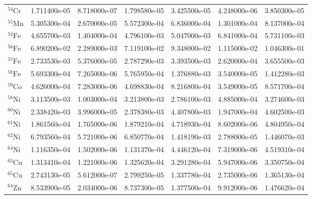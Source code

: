 \begin{tabular}{lrrrrrr}
$^{54}\mathrm{Cr}$  &       1.711400e-05 &      8.718000e-07 &      1.798580e-05 &       3.425500e-05 &      4.248000e-06 &      3.850300e-05 \\
$^{55}\mathrm{Mn}$  &       5.305300e-04 &      2.670000e-05 &      5.572300e-04 &       6.836000e-04 &      1.301000e-04 &      8.137000e-04 \\
$^{54}\mathrm{Fe}$  &       4.655700e-03 &      1.404000e-04 &      4.796100e-03 &       5.047000e-03 &      6.841000e-04 &      5.731100e-03 \\
$^{56}\mathrm{Fe}$  &       6.890200e-02 &      2.289000e-03 &      7.119100e-02 &       9.348000e-02 &      1.115000e-02 &      1.046300e-01 \\
$^{57}\mathrm{Fe}$  &       2.733530e-03 &      5.376000e-05 &      2.787290e-03 &       3.393500e-03 &      2.620000e-04 &      3.655500e-03 \\
$^{58}\mathrm{Fe}$  &       5.693300e-04 &      7.265000e-06 &      5.765950e-04 &       1.376880e-03 &      3.540000e-05 &      1.412280e-03 \\
$^{59}\mathrm{Co}$  &       4.626000e-04 &      7.283000e-06 &      4.698830e-04 &       8.216800e-04 &      3.549000e-05 &      8.571700e-04 \\
$^{58}\mathrm{Ni}$  &       3.113500e-03 &      1.003000e-04 &      3.213800e-03 &       2.786100e-03 &      4.885000e-04 &      3.274600e-03 \\
$^{60}\mathrm{Ni}$  &       2.338420e-03 &      3.996000e-05 &      2.378380e-03 &       4.407800e-03 &      1.947000e-04 &      4.602500e-03 \\
$^{61}\mathrm{Ni}$  &       1.861560e-04 &      1.765000e-06 &      1.879210e-04 &       4.718930e-04 &      8.602000e-06 &      4.804950e-04 \\
$^{62}\mathrm{Ni}$  &       6.793560e-04 &      5.721000e-06 &      6.850770e-04 &       1.418190e-03 &      2.788000e-05 &      1.446070e-03 \\
$^{64}\mathrm{Ni}$  &       1.116350e-04 &      1.502000e-06 &      1.131370e-04 &       4.446120e-04 &      7.319000e-06 &      4.519310e-04 \\
$^{63}\mathrm{Cu}$  &       1.313410e-04 &      1.221000e-06 &      1.325620e-04 &       3.291280e-04 &      5.947000e-06 &      3.350750e-04 \\
$^{65}\mathrm{Cu}$  &       2.743130e-05 &      5.612000e-07 &      2.799250e-05 &       1.337780e-04 &      2.735000e-06 &      1.365130e-04 \\
$^{64}\mathrm{Zn}$  &       8.533900e-05 &      2.034000e-06 &      8.737300e-05 &       1.377500e-04 &      9.912000e-06 &      1.476620e-04 \\

\end{tabular}
